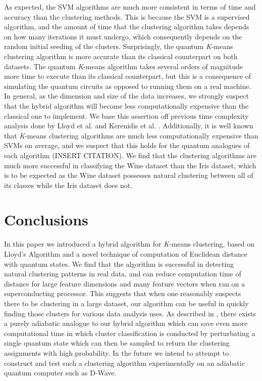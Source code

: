 \documentclass[twocolumn, english]{revtex4-2}
\begin{document}
As expected, the SVM algorithms are much more consistent in terms of time and accuracy than the clustering methods. This is because the SVM is a supervised algorithm, and the amount of time that the clustering algorithm takes depends on how many iterations it must undergo, which consequently depends on the random initial seeding of the clusters. Surprisingly, the quantum \textit{K}-means clustering algorithm is more accurate than its classical counterpart on both datasets. The quantum \textit{K}-means algorithm takes several orders of magnitude more time to execute than its classical counterpart, but this is a consequence of simulating the quantum circuits as opposed to running them on a real machine. In general, as the dimension and size of the data increases, we strongly suspect that the hybrid algorithm will become less computationally expensive than the classical one to implement. We base this assertion off previous time complexity analysis done by Lloyd et al. \cite{lloydlearning} and Kerenidis et al. \cite{qmeans}. Additionally, it is well known that \textit{K}-means clustering algorithms are much less computationally expensive than SVMs on average, and we suspect that this holds for the quantum analogues of each algorithm (INSERT CITATION). We find that the clustering algorithms are much more successful in classifying the Wine dataset than the Iris dataset, which is to be expected as the Wine dataset possesses natural clustering between all of its classes while the Iris dataset does not. 

\section{Conclusions}
In this paper we introduced a hybrid algorithm for \textit{K}-means clustering, based on Lloyd's Algorithm and a novel technique of computation of Euclidean distance with quantum states. We find that the algorithm is successful in detecting natural clustering patterns in real data, and can reduce computation time of distance for large feature dimensions and many feature vectors when ran on a superconducting processor. This suggests that when one reasonably suspects there to be clustering in a large dataset, our algorithm can be useful in quickly finding those clusters for various data analysis uses. As described in \cite{lloydlearning}, there exists a purely adiabatic analogue to our hybrid algorithm which can save even more computational time in which cluster classification is conducted by perturbating a single quantum state which can then be sampled to return the clustering assignments with high probability. In the future we intend to attempt to construct and test such a clustering algorithm experimentally on an adiabatic quantum computer such as D-Wave.

\onecolumngrid
{}
\end{document}
